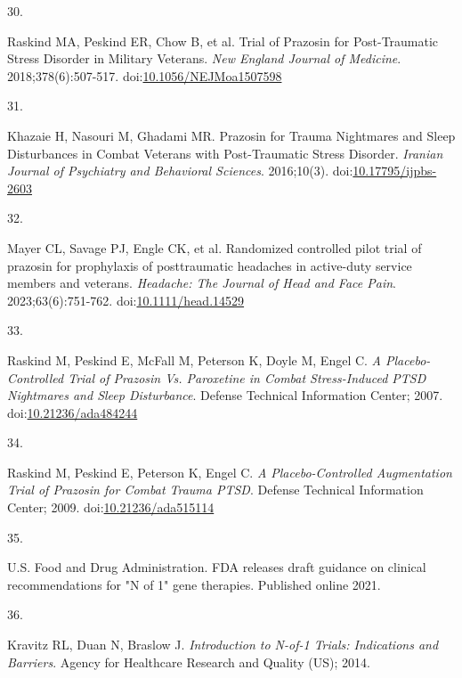 \documentclass[
  11pt,
]{article}
\newlength{\cslhangindent}
\newlength{\csllabelwidth}
\newenvironment{CSLReferences}[2] %
 {\begin{list}{}{%
  \setlength{\itemindent}{0pt}
  \setlength{\leftmargin}{0pt}
  \setlength{\parsep}{0pt}
  \ifodd #1
   \setlength{\leftmargin}{\cslhangindent}
   \setlength{\itemindent}{-1\cslhangindent}
  \fi
  \setlength{\itemsep}{#2\baselineskip}}}
 {\end{list}}
\newcommand{\CSLLeftMargin}[1]{\parbox[t]{\csllabelwidth}{\strut#1\strut}}
\newcommand{\CSLRightInline}[1]{\parbox[t]{\linewidth - \csllabelwidth}{\strut#1\strut}}
\begin{document}
\begin{CSLReferences}{0}{1}
\CSLLeftMargin{30. }%
\CSLRightInline{Raskind MA, Peskind ER, Chow B, et al. Trial of
{Prazosin} for {Post-Traumatic Stress Disorder} in {Military Veterans}.
\emph{New England Journal of Medicine}. 2018;378(6):507-517.
doi:\href{https://doi.org/10.1056/NEJMoa1507598}{10.1056/NEJMoa1507598}}

\CSLLeftMargin{31. }%
\CSLRightInline{Khazaie H, Nasouri M, Ghadami MR. Prazosin for {Trauma
Nightmares} and {Sleep Disturbances} in {Combat Veterans} with
{Post-Traumatic Stress Disorder}. \emph{Iranian Journal of Psychiatry
and Behavioral Sciences}. 2016;10(3).
doi:\href{https://doi.org/10.17795/ijpbs-2603}{10.17795/ijpbs-2603}}

\CSLLeftMargin{32. }%
\CSLRightInline{Mayer CL, Savage PJ, Engle CK, et al. Randomized
controlled pilot trial of prazosin for prophylaxis of posttraumatic
headaches in active-duty service members and veterans. \emph{Headache:
The Journal of Head and Face Pain}. 2023;63(6):751-762.
doi:\href{https://doi.org/10.1111/head.14529}{10.1111/head.14529}}

\CSLLeftMargin{33. }%
\CSLRightInline{Raskind M, Peskind E, McFall M, Peterson K, Doyle M,
Engel C. \emph{A {Placebo-Controlled Trial} of {Prazosin} Vs.
{Paroxetine} in {Combat Stress-Induced PTSD Nightmares} and {Sleep
Disturbance}}. Defense Technical Information Center; 2007.
doi:\href{https://doi.org/10.21236/ada484244}{10.21236/ada484244}}

\CSLLeftMargin{34. }%
\CSLRightInline{Raskind M, Peskind E, Peterson K, Engel C. \emph{A
{Placebo-Controlled Augmentation Trial} of {Prazosin} for {Combat Trauma
PTSD}}. Defense Technical Information Center; 2009.
doi:\href{https://doi.org/10.21236/ada515114}{10.21236/ada515114}}

\CSLLeftMargin{35. }%
\CSLRightInline{U.S. Food and Drug Administration. {FDA} releases draft
guidance on clinical recommendations for "{N} of 1" gene therapies.
Published online 2021.}

\CSLLeftMargin{36. }%
\CSLRightInline{Kravitz RL, Duan N, Braslow J. \emph{Introduction to
{N-of-1} Trials: {Indications} and Barriers}. {Agency for Healthcare
Research and Quality (US)}; 2014.}


\end{CSLReferences}
\end{document}
